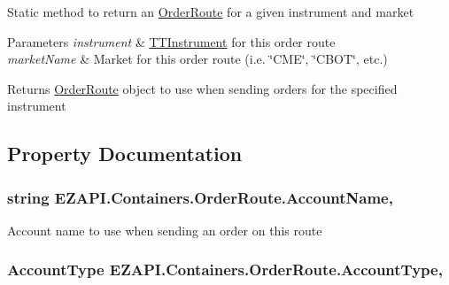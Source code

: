 Static method to return an \hyperlink{class_e_z_a_p_i_1_1_containers_1_1_order_route}{Order\-Route} for a given instrument and market 


\begin{DoxyParams}{Parameters}
{\em instrument} & \hyperlink{class_e_z_a_p_i_1_1_containers_1_1_t_t_instrument}{T\-T\-Instrument} for this order route\\
\hline
{\em market\-Name} & Market for this order route (i.\-e. \char`\"{}\-C\-M\-E\char`\"{}, \char`\"{}\-C\-B\-O\-T\char`\"{}, etc.)\\
\hline
\end{DoxyParams}
\begin{DoxyReturn}{Returns}
\hyperlink{class_e_z_a_p_i_1_1_containers_1_1_order_route}{Order\-Route} object to use when sending orders for the specified instrument
\end{DoxyReturn}


\subsection{Property Documentation}
\hypertarget{class_e_z_a_p_i_1_1_containers_1_1_order_route_ac50589d901ca7d35d3f0179acb57699c}{
\subsubsection[{Account\-Name}]{\setlength{\rightskip}{0pt plus 5cm}string E\-Z\-A\-P\-I.\-Containers.\-Order\-Route.\-Account\-Name\hspace{0.3cm}{\ttfamily [get]}, {\ttfamily [set]}}}\label{class_e_z_a_p_i_1_1_containers_1_1_order_route_ac50589d901ca7d35d3f0179acb57699c}


Account name to use when sending an order on this route 

\hypertarget{class_e_z_a_p_i_1_1_containers_1_1_order_route_ae21d1fe7a3e0b80092bfdf5321141693}{
\subsubsection[{Account\-Type}]{\setlength{\rightskip}{0pt plus 5cm}Account\-Type E\-Z\-A\-P\-I.\-Containers.\-Order\-Route.\-Account\-Type\hspace{0.3cm}{\ttfamily [get]}, {\ttfamily [set]}}}\label{class_e_z_a_p_i_1_1_containers_1_1_order_route_ae21d1fe7a3e0b80092bfdf5321141693}


